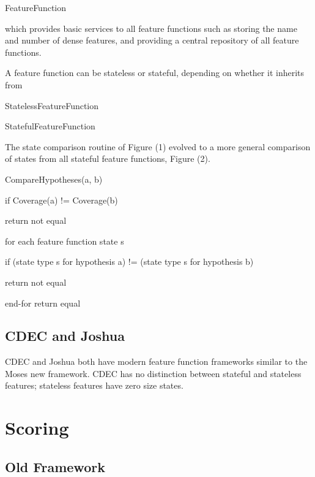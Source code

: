 \documentclass{pbml}
\begin{document}
    FeatureFunction

which provides basic services to all feature functions such as storing the name and number of dense features, and providing a central repository of all feature functions.

A feature function can be stateless or stateful, depending on whether it inherits from

StatelessFeatureFunction

StatefulFeatureFunction

The state comparison routine of Figure (1) evolved to a more general comparison of states from all stateful feature functions, Figure (2).

    CompareHypotheses(a, b)

       if Coverage(a) != Coverage(b)

         return not equal

        for each feature function state s

          if (state type s for hypothesis a) != (state type s for hypothesis b)

             return not equal

        end-for
        return equal
        
\subsection{CDEC and Joshua}
CDEC and Joshua both have modern feature function frameworks similar to the Moses new framework. CDEC has no distinction between stateful and stateless features; stateless features have zero size states.

\section{Scoring}
\subsection{Old Framework}


\end{document}
